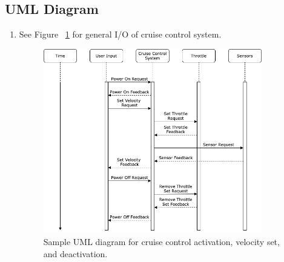 \documentclass[preprint,11pt,3p]{article}
\begin{document}
\subsection{UML Diagram}
\begin{enumerate}
	\item See Figure ~\ref{fig:ccUML1} for general I/O of cruise control system. %
		\begin{figure}[h]
			\includegraphics[width=0.9\textwidth]{images/ccUML.png}
			\caption{Sample UML diagram for cruise control activation, velocity set, and deactivation.}
			\label{fig:ccUML1}
		\end{figure}
\end{enumerate}


	
\end{document}

